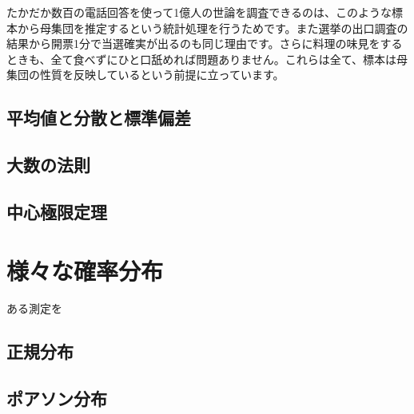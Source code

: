 たかだか数百の電話回答を使って1億人の世論を調査できるのは、このような標本から母集団を推定するという統計処理を行うためです。また選挙の出口調査の結果から開票1分で当選確実が出るのも同じ理由です。さらに料理の味見をするときも、全て食べずにひと口舐めれば問題ありません。これらは全て、標本は母集団の性質を反映しているという前提に立っています。

\subsection{平均値と分散と標準偏差}

\subsection{大数の法則}

\subsection{中心極限定理}

\section{様々な確率分布}

ある測定を

\subsection{正規分布}
\subsection{ポアソン分布}



